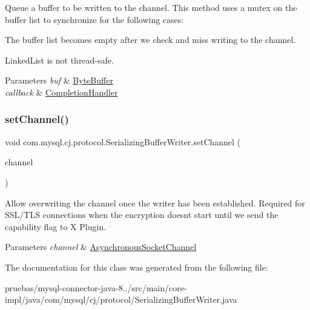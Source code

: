 Queue a buffer to be written to the channel. This method uses a mutex on the buffer list to synchronize for the following cases\+: 
\begin{DoxyItemize}
\item The buffer list becomes empty after we check and miss writing to the channel. 
\item Linked\+List is not thread-\/safe. 
\end{DoxyItemize}


\begin{DoxyParams}{Parameters}
{\em buf} & \mbox{\hyperlink{}{Byte\+Buffer}} \\
\hline
{\em callback} & \mbox{\hyperlink{}{Completion\+Handler}} \\
\hline
\end{DoxyParams}
\mbox{\label{classcom_1_1mysql_1_1cj_1_1protocol_1_1_serializing_buffer_writer_ac59dda63c81fa3c5f00f82924b1c63c5}} 
\subsubsection{\texorpdfstring{set\+Channel()}{setChannel()}}
{\footnotesize\ttfamily void com.\+mysql.\+cj.\+protocol.\+Serializing\+Buffer\+Writer.\+set\+Channel (\begin{DoxyParamCaption}\item[{Asynchronous\+Socket\+Channel}]{channel }\end{DoxyParamCaption})}

Allow overwriting the channel once the writer has been established. Required for S\+S\+L/\+T\+LS connections when the encryption doesn\textquotesingle{}t start until we send the capability flag to X Plugin.


\begin{DoxyParams}{Parameters}
{\em channel} & \mbox{\hyperlink{}{Asynchronous\+Socket\+Channel}} \\
\hline
\end{DoxyParams}


The documentation for this class was generated from the following file\+:\begin{DoxyCompactItemize}
\item 
pruebas/mysql-\/connector-\/java-\/8../src/main/core-\/impl/java/com/mysql/cj/protocol/Serializing\+Buffer\+Writer.\+java\end{DoxyCompactItemize}
